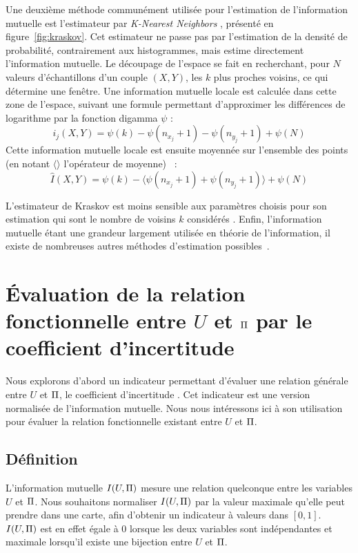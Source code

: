 \documentclass[../main]{subfiles}
\begin{document}
Une deuxième méthode communément utilisée pour l'estimation de l'information mutuelle est l'estimateur par \emph{K-Nearest Neighbors} \parencite{2004kraskov}, présenté en figure~\ref{fig:kraskov}.
Cet estimateur ne passe pas par l'estimation de la densité de probabilité, contrairement aux histogrammes, mais estime directement l'information mutuelle.
Le découpage de l'espace se fait en recherchant, pour $N$ valeurs d'échantillons d'un couple $(X,Y)$, les $k$ plus proches voisins, ce qui détermine une fenêtre. Une information mutuelle locale est calculée dans cette zone de l'espace, suivant une formule permettant d'approximer les différences de logarithme par la fonction digamma $\psi$ : 
$$i_j(X,Y) = \psi(k) - \psi(n_{x_j} + 1) - \psi(n_{y_j} +1) + \psi(N)$$
Cette information mutuelle locale est ensuite moyennée sur l'ensemble des points (en notant $\langle \rangle$ l'opérateur de moyenne) ~: 
\begin{equation}\label{eq:knn}
    \hat{I}(X,Y) = \psi(k) - \langle\psi(n_{x_j} + 1) + \psi(n_{y_j} +1)\rangle + \psi(N)
\end{equation}
    
L'estimateur de Kraskov est moins sensible aux paramètres choisis pour son estimation qui sont le nombre de voisins $k$ considérés \parencite{ross_mutual_2014}.
Enfin, l'information mutuelle étant une grandeur largement utilisée en théorie de l'information, il existe de nombreuses autres méthodes d'estimation possibles~\parencite{Doquire2012ACO}.

\section{\'Evaluation de la relation fonctionnelle entre $U$ et $\Pi$ par le coefficient d'incertitude}

Nous explorons d'abord un indicateur permettant d'évaluer une relation générale entre $U$ et $\Pi$, le coefficient d'incertitude \parencite{Theil1961EconomicFA}. 
Cet indicateur est une version normalisée de l'information mutuelle. Nous nous intéressons ici à son utilisation pour évaluer la relation fonctionnelle existant entre $U$ et $\Pi$.

\subsection{Définition}

L'information mutuelle $I(U,\Pi)$ mesure une relation quelconque entre les variables $U$ et $\Pi$.
Nous souhaitons normaliser $I(U,\Pi)$ par la valeur maximale qu'elle peut prendre dans une carte, afin d'obtenir un indicateur à valeurs dans $[0,1]$. 
$I(U,\Pi)$ est en effet égale à 0 lorsque les deux variables sont indépendantes et maximale lorsqu'il existe une bijection entre $U$ et $\Pi$.
\end{document}
